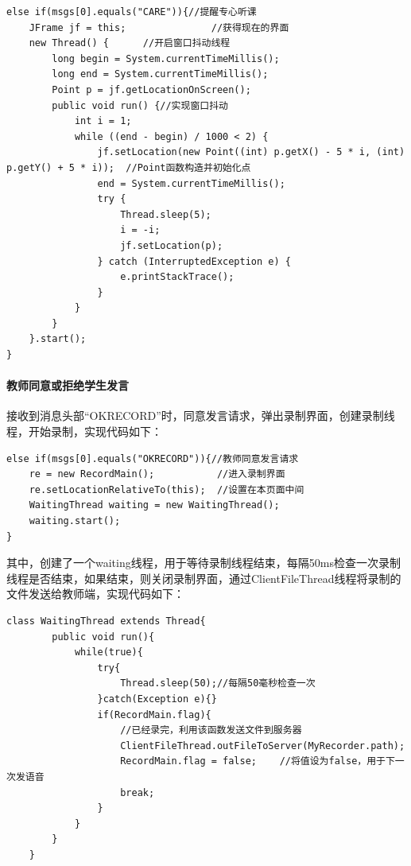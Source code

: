\documentclass[UTF8,12pt]{article}
\begin{document}
\begin{lstlisting}[title=提醒听课,frame=shadowbox]
    else if(msgs[0].equals("CARE")){//提醒专心听课
    JFrame jf = this;				//获得现在的界面
    new Thread() {      //开启窗口抖动线程
        long begin = System.currentTimeMillis();
        long end = System.currentTimeMillis();
        Point p = jf.getLocationOnScreen();
        public void run() {//实现窗口抖动
            int i = 1;
            while ((end - begin) / 1000 < 2) {
                jf.setLocation(new Point((int) p.getX() - 5 * i, (int) p.getY() + 5 * i));  //Point函数构造并初始化点
                end = System.currentTimeMillis();
                try {
                    Thread.sleep(5);
                    i = -i;
                    jf.setLocation(p);
                } catch (InterruptedException e) {
                    e.printStackTrace();
                }
            }
        }
    }.start();
}
\end{lstlisting}

\paragraph{教师同意或拒绝学生发言}
接收到消息头部“OKRECORD”时，同意发言请求，弹出录制界面，创建录制线程，开始录制，实现代码如下：

\begin{lstlisting}[title=教师同意或拒绝学生发言,frame=shadowbox]
    else if(msgs[0].equals("OKRECORD")){//教师同意发言请求
    re = new RecordMain();           //进入录制界面
    re.setLocationRelativeTo(this);  //设置在本页面中间
    WaitingThread waiting = new WaitingThread();
    waiting.start();
}
\end{lstlisting}

其中，创建了一个waiting线程，用于等待录制线程结束，每隔50ms检查一次录制线程是否结束，如果结束，则关闭录制界面，通过ClientFileThread线程将录制的文件发送给教师端，实现代码如下：

\begin{lstlisting}[title=等待录制线程结束,frame=shadowbox]
    class WaitingThread extends Thread{
        public void run(){
            while(true){
                try{
                    Thread.sleep(50);//每隔50毫秒检查一次
                }catch(Exception e){}
                if(RecordMain.flag){
                    //已经录完，利用该函数发送文件到服务器
                    ClientFileThread.outFileToServer(MyRecorder.path);
                    RecordMain.flag = false;    //将值设为false，用于下一次发语音
                    break;
                }
            }
        }
    }
\end{lstlisting}
\end{document}
